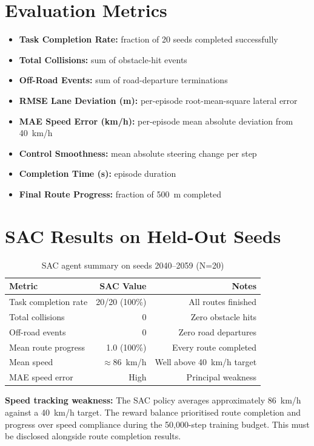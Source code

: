 \documentclass[12pt,a4paper]{report}
\begin{document}
\section{Evaluation Metrics}

\begin{itemize}
  \item \textbf{Task Completion Rate:} fraction of 20 seeds completed successfully
  \item \textbf{Total Collisions:} sum of obstacle-hit events
  \item \textbf{Off-Road Events:} sum of road-departure terminations
  \item \textbf{RMSE Lane Deviation (m):} per-episode root-mean-square lateral error
  \item \textbf{MAE Speed Error (km/h):} per-episode mean absolute deviation from 40~km/h
  \item \textbf{Control Smoothness:} mean absolute steering change per step
  \item \textbf{Completion Time (s):} episode duration
  \item \textbf{Final Route Progress:} fraction of 500~m completed
\end{itemize}

\section{SAC Results on Held-Out Seeds}

\begin{table}[H]
\centering
\caption{SAC agent summary on seeds 2040--2059 (N=20)}
\label{tab:sac_results}
\begin{tabular}{lrr}
\toprule
Metric & SAC Value & Notes \\
\midrule
Task completion rate & 20/20 (100\%) & All routes finished \\
Total collisions & 0 & Zero obstacle hits \\
Off-road events & 0 & Zero road departures \\
Mean route progress & 1.0 (100\%) & Every route completed \\
Mean speed & $\approx$86~km/h & Well above 40~km/h target \\
MAE speed error & High & Principal weakness \\
\bottomrule
\end{tabular}
\end{table}

\textbf{Speed tracking weakness:} The SAC policy averages approximately 86~km/h against a 40~km/h target. The reward balance prioritised route completion and progress over speed compliance during the 50,000-step training budget. This must be disclosed alongside route completion results.
\end{document}
